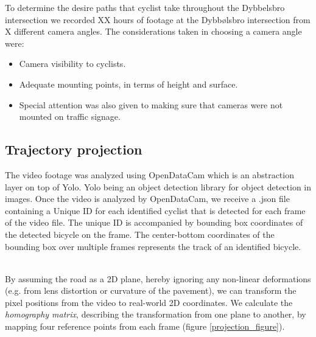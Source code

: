 \documentclass[
10pt, %
a4paper, %
oneside, %
headinclude,footinclude, %
] {book}%
\begin{document}
To determine the desire paths that cyclist take throughout the Dybbelsbro intersection we recorded XX hours of footage 
at the Dybbølsbro intersection from X different camera angles.
The considerations taken in choosing a camera angle were:

\begin{itemize}
	\item Camera visibility to cyclists.
	\item Adequate mounting points, in terms of height and surface.
	\item Special attention was also given to making sure that cameras were not mounted on traffic signage.
\end{itemize}

\subsection{Trajectory projection}
The video footage was analyzed using OpenDataCam which is an abstraction layer on top of Yolo. Yolo being an object detection library for object detection in images.
Once the video is analyzed by OpenDataCam, we receive a .json file containing a Unique ID for each identified cyclist that is detected for each frame of the video file. 
The unique ID is accompanied by bounding box coordinates of the detected bicycle on the frame. 
The center-bottom coordinates of the bounding box over multiple frames represents the track of an identified bicycle.

\ \\
By assuming the road as a 2D plane, hereby ignoring any non-linear deformations (e.g. from lens distortion or curvature of the pavement), 
we can transform the pixel positions from the video to real-world 2D coordinates. 
We calculate the \textit{homography matrix}, describing the transformation from one plane to another, by mapping four reference points from each frame (figure \ref{projection_figure}).
\end{document}
